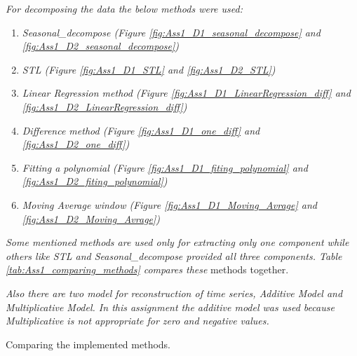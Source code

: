 \textit{For decomposing the data the below methods were used:}
    \begin{enumerate}
    \item \textit{Seasonal\_decompose (Figure
        \ref{fig:Ass1_D1_seasonal_decompose} and \ref{fig:Ass1_D2_seasonal_decompose})}
        
    \item \textit{STL (Figure
        \ref{fig:Ass1_D1_STL} and \ref{fig:Ass1_D2_STL})}
        
    \item \textit{Linear Regression method (Figure
        \ref{fig:Ass1_D1_LinearRegression_diff} and \ref{fig:Ass1_D2_LinearRegression_diff})}
        
    \item \textit{Difference method (Figure
        \ref{fig:Ass1_D1_one_diff} and \ref{fig:Ass1_D2_one_diff})}
        
    \item \textit{Fitting a polynomial (Figure
        \ref{fig:Ass1_D1_fiting_polynomial} and \ref{fig:Ass1_D2_fiting_polynomial})}
        
    \item \textit{Moving Average window (Figure
        \ref{fig:Ass1_D1_Moving_Avrage} and \ref{fig:Ass1_D2_Moving_Avrage})}

    \end{enumerate}
    
\textit{Some mentioned methods are used only for extracting only one component while others like STL and Seasonal\_decompose provided all three components. Table \ref{tab:Ass1_comparing_methods} compares these} methods together.

\textit{Also there are two model for reconstruction of time series, Additive Model and Multiplicative Model. In this assignment the additive model was used because Multiplicative is not appropriate for zero and negative values.}

\begin{table}[H]
\centering
\caption{Comparing the implemented methods.
\label{tab:Ass1_comparing_methods}}

\end{table}




